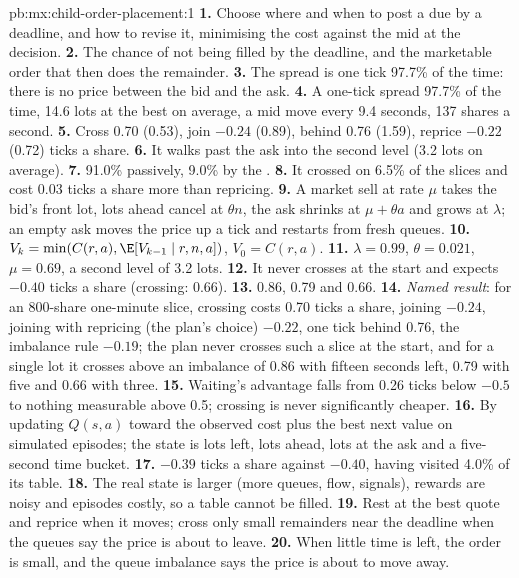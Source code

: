 \begin{solution}{pb:mx:child-order-placement:1}
\textbf{1.} Choose where and when to post a  due by a deadline, and how to revise it, minimising the cost against the mid at the decision.
\textbf{2.} The chance of not being filled by the deadline, and the marketable order that then does the remainder.
\textbf{3.} The spread is one tick 97.7\% of the time: there is no price between the bid and the ask.
\textbf{4.} A one-tick spread 97.7\% of the time, 14.6 lots at the best on average, a mid move every 9.4 seconds, 137 shares a second.
\textbf{5.} Cross 0.70 (0.53), join $-0.24$ (0.89), behind 0.76 (1.59), reprice $-0.22$ (0.72) ticks a share.
\textbf{6.} It walks past the ask into the second level (3.2 lots on average).
\textbf{7.} 91.0\% passively, 9.0\% by the .
\textbf{8.} It crossed on 6.5\% of the slices and cost 0.03 ticks a share more than repricing.
\textbf{9.} A market sell at rate $\mu$ takes the bid's front lot, lots ahead cancel at $\theta n$, the ask shrinks at $\mu+\theta a$ and grows at
$\lambda$; an empty ask moves the price up a tick and restarts from fresh queues.
\textbf{10.} $V_k=\min(C(r,a),\E[V_{k-1}\mid r,n,a])$, $V_0=C(r,a)$.
\textbf{11.} $\lambda=0.99$, $\theta=0.021$, $\mu=0.69$, a second level of 3.2 lots.
\textbf{12.} It never crosses at the start and expects $-0.40$ ticks a share (crossing: 0.66).
\textbf{13.} 0.86, 0.79 and 0.66.
\textbf{14.} \emph{Named result}: for an 800-share one-minute slice, crossing costs 0.70 ticks a share, joining $-0.24$, joining with repricing
(the plan's choice) $-0.22$, one tick behind 0.76, the imbalance rule $-0.19$; the plan never crosses such a slice at the start, and for a single
lot it crosses above an imbalance of 0.86 with fifteen seconds left, 0.79 with five and 0.66 with three.
\textbf{15.} Waiting's advantage falls from 0.26 ticks below $-0.5$ to nothing measurable above 0.5; crossing is never significantly cheaper.
\textbf{16.} By updating $Q(s,a)$ toward the observed cost plus the best next value on simulated episodes; the state is lots left, lots ahead, lots
at the ask and a five-second time bucket.
\textbf{17.} $-0.39$ ticks a share against $-0.40$, having visited 4.0\% of its table.
\textbf{18.} The real state is larger (more queues, flow, signals), rewards are noisy and episodes costly, so a table cannot be filled.
\textbf{19.} Rest at the best quote and reprice when it moves; cross only small remainders near the deadline when the queues say the price is about
to leave.
\textbf{20.} When little time is left, the order is small, and the queue imbalance says the price is about to move away.
\end{solution}

